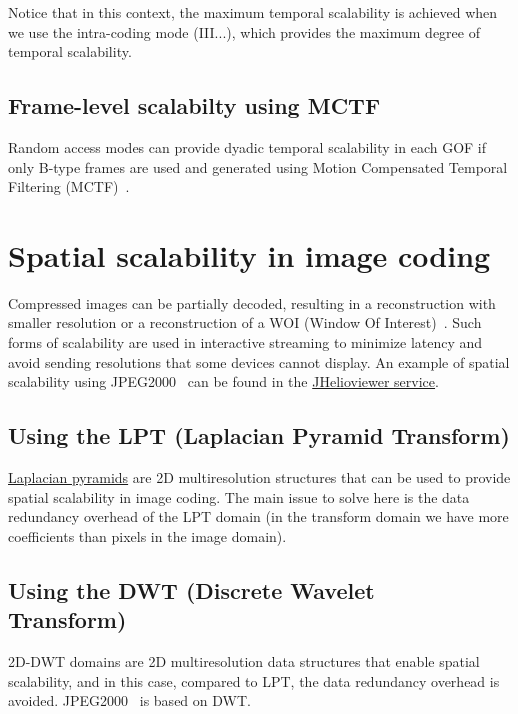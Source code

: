Notice that in this context, the maximum temporal scalability is
achieved when we use the intra-coding mode (III...), which provides
the maximum degree of temporal scalability.

\subsection{Frame-level scalabilty using MCTF}

Random access modes can provide dyadic temporal scalability in each
GOF if only B-type frames are used and generated using Motion
Compensated Temporal Filtering (MCTF)~\cite{vruiz__MC,vruiz__MCTF}.


\section{Spatial scalability in image coding~\cite{vruiz__JPEG2000}}


Compressed images can be partially decoded, resulting in a
reconstruction with smaller resolution or a reconstruction of a WOI
(Window Of Interest)~\cite{vruiz__JPEG2000}. Such forms of scalability
are used in interactive streaming to minimize latency and avoid
sending resolutions that some devices cannot display. An example of
spatial scalability using JPEG2000~\cite{vruiz__JPEG2000} can be found
in the \href{https://www.jhelioviewer.org/}{JHelioviewer service}.

\subsection{Using the LPT (Laplacian Pyramid Transform)}

\href{https://en.wikipedia.org/wiki/Pyramid_(image_processing)#Laplacian_pyramid}{Laplacian
  pyramids} are 2D multiresolution structures that can be used to
provide spatial scalability in image coding. The main issue to solve
here is the data redundancy overhead of the LPT domain (in the
transform domain we have more coefficients than pixels in the image
domain).

\subsection{Using the DWT (Discrete Wavelet Transform)~\cite{vruiz__JPEG2000}}

2D-DWT domains are 2D multiresolution data structures that enable
spatial scalability, and in this case, compared to LPT, the data
redundancy overhead is avoided. JPEG2000~\cite{vruiz__JPEG2000} is
based on DWT.

